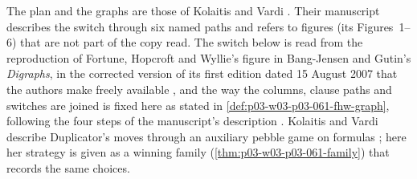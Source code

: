 The plan and the graphs are those of Kolaitis and Vardi
\cite[pp.~29--39]{KolaitisVardi1995DatalogManuscript}. Their manuscript
describes the switch through six named paths and refers to figures (its
Figures~1--6) that are not part of the copy read. The switch below is read
from the reproduction of Fortune, Hopcroft and Wyllie's figure in
Bang-Jensen and Gutin's \emph{Digraphs}, in the corrected version of its
first edition dated 15 August 2007 that the authors make freely available
\cite[Fig.~9.1, p.~479]{BangJensenGutin2007DigraphsCorrected}, and the way
the columns, clause paths and switches are joined is fixed here as stated in
\cref{def:p03-w03-p03-061-fhw-graph}, following the four steps of the
manuscript's description \cite[p.~31]{KolaitisVardi1995DatalogManuscript}.
Kolaitis and Vardi describe Duplicator's moves through an auxiliary pebble
game on formulas \cite[Def.~6.5, p.~33]{KolaitisVardi1995DatalogManuscript};
here her strategy is given as a winning family
(\cref{thm:p03-w03-p03-061-family}) that records the same choices.

